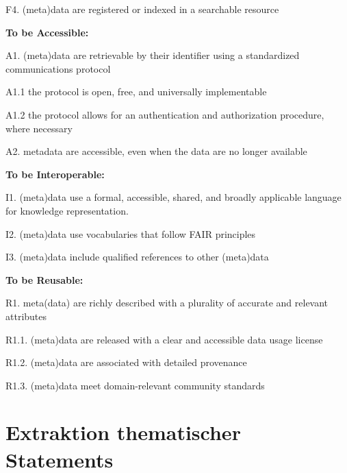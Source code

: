 \documentclass[
  12pt,
  letterpaper,
  DIV=11,
  numbers=noendperiod]{scrreprt}
\begin{document}
F4. (meta)data are registered or indexed in a searchable resource

\textbf{To be Accessible:}

A1. (meta)data are retrievable by their identifier using a standardized
communications protocol

A1.1 the protocol is open, free, and universally implementable

A1.2 the protocol allows for an authentication and authorization
procedure, where necessary

A2. metadata are accessible, even when the data are no longer available

\textbf{To be Interoperable:}

I1. (meta)data use a formal, accessible, shared, and broadly applicable
language for knowledge representation.

I2. (meta)data use vocabularies that follow FAIR principles

I3. (meta)data include qualified references to other (meta)data

\textbf{To be Reusable:}

R1. meta(data) are richly described with a plurality of accurate and
relevant attributes

R1.1. (meta)data are released with a clear and accessible data usage
license

R1.2. (meta)data are associated with detailed provenance

R1.3. (meta)data meet domain-relevant community standards


\chapter{Extraktion thematischer
Statements}\label{extraktion-thematischer-statements}
\end{document}
